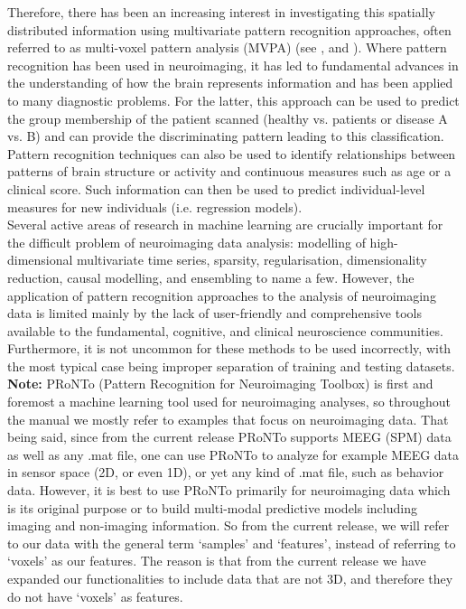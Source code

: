 Therefore, there has been an increasing interest in investigating this spatially distributed information using multivariate pattern recognition approaches, often referred to as  multi-voxel pattern analysis (MVPA) (see  \cite{Norman2006},  \cite{Haynes2006} and \cite{Pereira2009}). Where pattern recognition has been used in neuroimaging, it has led to fundamental advances in the understanding of how the brain represents information and has been applied to many diagnostic problems. For the latter, this approach can be used to predict the group membership of the patient scanned (healthy vs. patients or disease A vs. B) and can provide the discriminating pattern leading to this classification. Pattern recognition techniques can also be used to identify relationships between patterns of brain structure or activity and continuous measures such as age or a clinical score. Such information can then be used to predict individual-level measures for new individuals (i.e. regression models).
\\

Several active areas of research in machine learning are crucially important for the difficult problem of neuroimaging data analysis: modelling of high-dimensional multivariate time series, sparsity, regularisation, dimensionality reduction, causal modelling, and ensembling to name a few. However, the application of pattern recognition approaches to the analysis of neuroimaging data is limited mainly by the lack of user-friendly and comprehensive tools available to the fundamental, cognitive, and clinical neuroscience communities. Furthermore, it is not uncommon for these methods to be used incorrectly, with the most typical case being improper separation of training and testing datasets.
\\

\noindent \textbf{Note:} PRoNTo (Pattern Recognition for Neuroimaging Toolbox) is first and foremost a machine learning tool used for neuroimaging analyses, so throughout the manual we mostly refer to examples that focus on neuroimaging data. That being said, since from the current release PRoNTo supports MEEG (SPM) data as well as any .mat file, one can use PRoNTo to analyze for example MEEG data in sensor space (2D, or even 1D), or yet any kind of .mat file, such as behavior data. However, it is best to use PRoNTo primarily for neuroimaging data which is its original purpose or to build multi-modal predictive models including imaging and non-imaging information. So from the current release, we will refer to our data with the general term `samples' and `features', instead of referring to `voxels' as our features. The reason is that from the current release we have expanded our functionalities to include data that are not 3D, and therefore they do not have `voxels' as features.
\\

